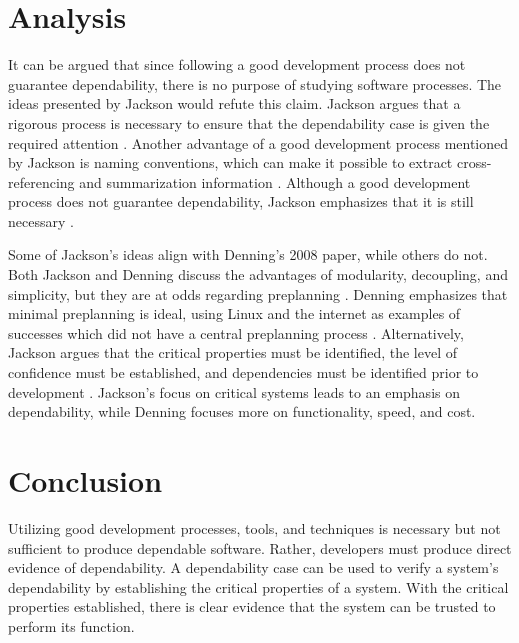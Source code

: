 \documentclass[11pt]{article}
\begin{document}
\begin{doublespace}
  \section{Analysis}
  
It can be argued that since following a good development process does not guarantee dependability, there is no purpose of studying software processes. The ideas presented by Jackson would refute this claim.  Jackson argues that a rigorous process is necessary to ensure that the dependability case is given the required attention \cite{jackson2009}. Another advantage of a good development process mentioned by Jackson is naming conventions, which can make it possible to extract cross-referencing and summarization information \cite{jackson2009}. Although a good development process does not guarantee dependability, Jackson emphasizes that it is still necessary \cite{jackson2009}.

Some of Jackson's ideas align with Denning's 2008 paper, while others do not. Both Jackson and Denning discuss the advantages of modularity, decoupling, and simplicity, but they are at odds regarding preplanning \cite{jackson2009,denning2008}. Denning emphasizes that minimal preplanning is ideal, using Linux and the internet as examples of successes which did not have a central preplanning process \cite{denning2008}. Alternatively, Jackson argues that the critical properties must be identified, the level of confidence must be established, and dependencies must be identified prior to development \cite{jackson2009}. Jackson's focus on critical systems leads to an emphasis on dependability, while Denning focuses more on functionality, speed, and cost.


  \section{Conclusion}

Utilizing good development processes, tools, and techniques is necessary but not sufficient to produce dependable software. Rather, developers must produce direct evidence of dependability. A dependability case can be used to verify a system's dependability by establishing the critical properties of a system. With the critical properties established, there is clear evidence that the system can be trusted to perform its function.

\end{doublespace}



\end{document}
